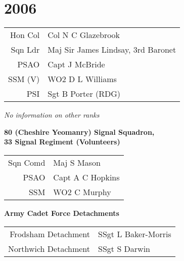 \chapter*{2006}

\begin{center}
  \small
  \begin{tabular}{rl}
    Hon Col & Col N C Glazebrook \\
    Sqn Ldr & Maj Sir James Lindsay, 3rd Baronet \\
    PSAO & Capt J McBride \\
    SSM (V) & WO2 D L Williams \\
    PSI & Sgt B Porter (RDG) \\
  \end{tabular}
\end{center}

\begin{center}
  \textit{No information on other ranks}
\end{center}

\begin{center}
  \Large
  \textbf{80 (Cheshire Yeomanry) Signal Squadron, \\ 33 Signal Regiment (Volunteers)}
\end{center}

\begin{center}
  \small
  \begin{tabular}{rl}
    Sqn Comd & Maj S Mason \\
    PSAO & Capt A C Hopkins \\
    SSM & WO2 C Murphy \\
  \end{tabular}
\end{center}

\begin{center}
  \Large
  \textbf{Army Cadet Force Detachments}
\end{center}

\begin{center}
  \small
  \begin{tabular}{rl}
    Frodsham Detachment & SSgt L Baker-Morris \\
    Northwich Detachment & SSgt S Darwin \\
  \end{tabular}
\end{center}

\vspace{50mm}

\pagebreak
